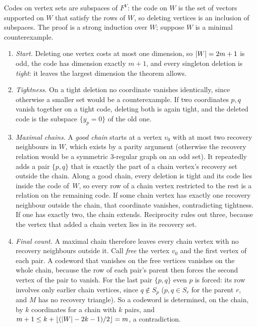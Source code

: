 \begin{outline}
Codes on vertex sets are subspaces of $F^V$: the code on $W$ is the set of vectors supported on $W$ that satisfy the rows of
$W$, so deleting vertices is an inclusion of subspaces. The proof is a strong induction over $W$; suppose $W$ is a minimal
counterexample.
\begin{enumerate}[leftmargin=2em]
\item \emph{Start.} Deleting one vertex costs at most one dimension, so $\lvert W \rvert=2m+1$ is odd, the code has dimension
exactly $m+1$, and every singleton deletion is \emph{tight}: it leaves the largest dimension the theorem allows.
\item \emph{Tightness.} On a tight deletion no coordinate vanishes identically, since otherwise a smaller set would be a
counterexample. If two coordinates $p,q$ vanish together on a tight code, deleting both is again tight, and the deleted
code is the subspace $\{y_p=0\}$ of the old one.
\item \emph{Maximal chains.} A \emph{good chain} starts at a vertex $v_0$ with at most two recovery neighbours in $W$, which
exists by a parity argument (otherwise the recovery relation would be a symmetric $3$-regular graph on an odd set). It
repeatedly adds a pair $\{p,q\}$ that is exactly the part of a chain vertex's recovery set outside the chain. Along a good
chain, every deletion is tight and its code lies inside the code of~$W$, so every row of a chain vertex restricted to
the rest is a relation on the remaining code. If some chain vertex has exactly one recovery neighbour outside the chain,
that coordinate vanishes, contradicting tightness. If one has exactly two, the chain extends. Reciprocity rules out
three, because the vertex that added a chain vertex lies in its recovery set.
\item \emph{Final count.} A maximal chain therefore leaves every chain vertex with no recovery neighbours outside it. Call
\emph{free} the vertex $v_0$ and the first vertex of each pair. A codeword that vanishes on the free vertices vanishes on
the whole chain, because the row of each pair's parent then forces the second vertex of the pair to vanish. For the last
pair $\{p,q\}$ even $p$ is forced: its row involves only earlier chain vertices, since $q\notin S_p$ ($p,q\in S_r$ for the
parent $r$, and $M$ has no recovery triangle). So a codeword is determined, on the chain, by $k$ coordinates for a chain
with $k$ pairs, and $m+1\le k+\lfloor(\lvert W \rvert-2k-1)/2\rfloor=m$, a contradiction.
\end{enumerate}
\end{outline}

